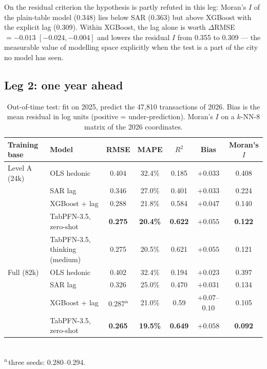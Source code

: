 \documentclass[11pt,a4paper]{article}
\begin{document}
On the residual criterion the hypothesis is partly refuted in this leg: Moran's $I$ of the
plain-table model (0.348) lies below SAR (0.363) but above XGBoost with the explicit lag (0.309).
Within XGBoost, the lag alone is worth $\Delta$RMSE $= -0.013$ $[-0.024, -0.004]$ and lowers the
residual $I$ from 0.355 to 0.309 --- the measurable value of modelling space explicitly when the
test is a part of the city no model has seen.

\subsection{Leg 2: one year ahead}

\begin{table}[h]
\centering\small
\caption{Out-of-time test: fit on 2025, predict the 47{,}810 transactions of 2026. Bias is the mean
residual in log units (positive = under-prediction). Moran's $I$ on a $k$-NN-8 matrix of the 2026
coordinates.}
\label{tab:oot}
\footnotesize\setlength{\tabcolsep}{3pt}
\begin{tabular}{llccccc}
\toprule
Training base & Model & RMSE & MAPE & $R^2$ & Bias & Moran's $I$ \\
\midrule
Level A (24k) & OLS hedonic & 0.404 & 32.4\% & 0.185 & $+0.033$ & 0.408 \\
 & SAR lag & 0.346 & 27.0\% & 0.401 & $+0.033$ & 0.224 \\
 & XGBoost + lag & 0.288 & 21.8\% & 0.584 & $+0.047$ & 0.140 \\
 & TabPFN-3.5, zero-shot & \textbf{0.275} & \textbf{20.4\%} & \textbf{0.622} & $+0.055$ & \textbf{0.122} \\
 & TabPFN-3.5, thinking (medium) & 0.275 & 20.5\% & 0.621 & $+0.055$ & 0.121 \\
\midrule
Full (82k) & OLS hedonic & 0.402 & 32.4\% & 0.194 & $+0.023$ & 0.397 \\
 & SAR lag & 0.326 & 25.0\% & 0.470 & $+0.031$ & 0.134 \\
 & XGBoost + lag & 0.287\textsuperscript{a} & 21.0\% & 0.59 & $+0.07$--$0.10$ & 0.105 \\
 & TabPFN-3.5, zero-shot & \textbf{0.265} & \textbf{19.5\%} & \textbf{0.649} & $+0.058$ & \textbf{0.092} \\
\bottomrule
\end{tabular}\\[2pt]
{\footnotesize \textsuperscript{a}\,three seeds: 0.280--0.294.}
\end{table}
\end{document}
